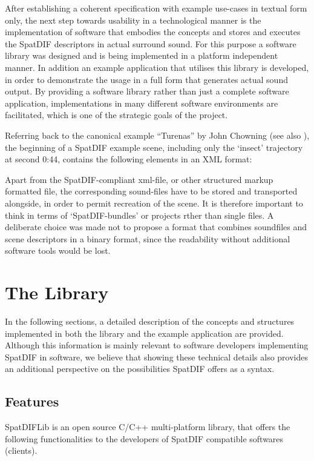 \documentclass[a4paper]{article}
\begin{document}
After establishing a coherent specification with example use-cases in textual form only, the next step towards usability in a technological manner is the implementation of software that embodies the concepts and stores and executes the SpatDIF descriptors in actual surround sound.
For this purpose a software library was designed and is being implemented in a platform independent manner. 
In addition an example application that utilises this library is developed, in order to demonstrate the usage in a full form that generates actual sound output.
By providing a software library rather than just a complete software application, implementations in many different software environments are facilitated, which is one of the  strategic goals of the project.
 
Referring back to the canonical example ``Turenas'' by John Chowning (see also \cite{Peters:2013SpatDifCMJ}), the beginning of a SpatDIF example scene, including only the `insect' trajectory at second 0:44, contains the following elements in an XML format:

 

Apart from the SpatDIF-compliant xml-file, or other structured markup formatted file, the corresponding sound-files have to be stored and transported alongside, in order to permit recreation of the scene.
It is therefore important to think in terms of `SpatDIF-bundles' or projects rther than single files.
A deliberate choice was made not to propose a format that combines soundfiles and scene descriptors in a binary format, since the readability without additional software tools would be lost.

\section{The Library} %

In the following sections, a detailed description of the concepts and structures implemented in both the library and the example application are provided.
Although this information is mainly relevant to software developers implementing SpatDIF in software, we believe that showing these technical details also provides an additional perspective on the possibilities SpatDIF offers as a syntax.

\subsection{Features}
SpatDIFLib is an open source C/C++ multi-platform library, that offers the following functionalities to the developers of SpatDIF compatible softwares (clients).
\end{document}
